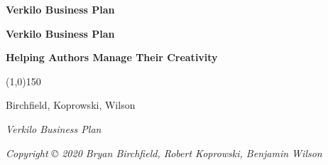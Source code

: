 \documentclass[11pt,openany]{book}
\begin{document}
  \sloppy %
  \setcounter{page}{1}
  \pagestyle{empty}
  \begin{center}
    \vspace*{\fill}

    \LARGE\textbf{\textsf{Verkilo Business Plan}}

    \vspace*{\fill}
    \vspace*{\fill}
  \end{center}
  \clearpage

  \newpage
  \emph{ }\newline
    \clearpage

  \begin{center}
    \vspace*{\fill}

    \Huge\textbf{\textsf{Verkilo Business Plan}}
    
    \vspace*{0.125in}
    \Large\textbf{\textsf{Helping Authors Manage Their Creativity}}
    
    \vspace*{0.25in}
    \line(1,0){150}
    \vspace*{0.25in}

    \Large\textsf{Birchfield, Koprowski, Wilson}

    \vspace*{\fill}
    \vspace*{\fill}
      \end{center}
  \clearpage

  \vspace*{\fill}

  \par\noindent\emph{Verkilo Business Plan}\newline
  \par\noindent\emph{Copyright © 2020 Bryan Birchfield, Robert
Koprowski, Benjamin Wilson}\newline
\end{document}
